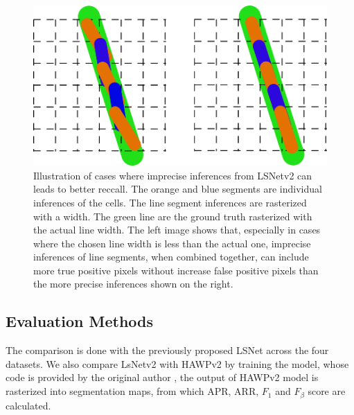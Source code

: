 \documentclass[journal]{IEEEtran}
\newcommand{\commentM}[1]{\textbf{\textcolor{blue}{M: #1}}}
\begin{document}
\begin{figure}
  \includegraphics[width=\linewidth]{imgs/others/why_f_beta.png}
  \caption{Illustration of cases where imprecise inferences from LSNetv2 can leads to better reccall. The orange and blue segments are individual inferences of the cells. The line segment inferences are rasterized with a width. The green line are the ground truth rasterized with the actual line width. The left image shows that, especially in cases where the chosen line width is less than the actual one, imprecise inferences of line segments, when combined together, can include more true positive pixels without increase false positive pixels than the more precise inferences shown on the right.}
  \label{hirecall}
\end{figure}

\subsection{Evaluation Methods}

The comparison is done with the previously proposed LSNet across the four datasets. We also compare LsNetv2 with HAWPv2 by training the model, whose code is provided by the original author \cite{hawpv2code}, the output of HAWPv2 model is rasterized into segmentation maps, from which APR, ARR, $F_1$ and $F_\beta$ score are calculated. 
\end{document}
